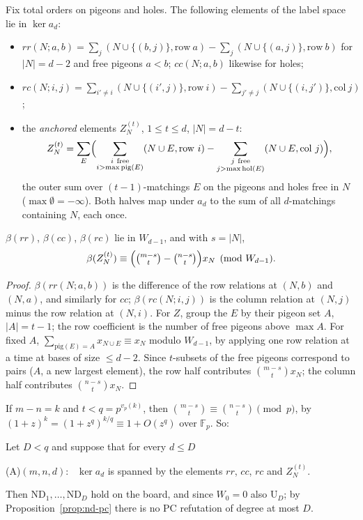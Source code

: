 Fix total orders on pigeons and holes.  The following elements of the label space lie in
$\ker a_d$:
\begin{itemize}
\item $rr(N;a,b)=\sum_j(N\cup\{(b,j)\},\mathrm{row}\ a)-\sum_j(N\cup\{(a,j)\},\mathrm{row}\ b)$
  for $|N|=d-2$ and free pigeons $a<b$; $cc(N;a,b)$ likewise for holes;
\item $rc(N;i,j)=\sum_{i'\ne i}(N\cup\{(i',j)\},\mathrm{row}\ i)-\sum_{j'\ne j}(N\cup\{(i,j')\},\mathrm{col}\ j)$;
\item the \emph{anchored} elements $Z^{(t)}_N$, $1\le t\le d$, $|N|=d-t$:
  \[
  Z^{(t)}_N=\sum_E\Bigl(\sum_{\substack{i\ \text{free}\\ i>\max\mathrm{pig}(E)}}(N\cup E,\mathrm{row}\ i)
     -\sum_{\substack{j\ \text{free}\\ j>\max\mathrm{hol}(E)}}(N\cup E,\mathrm{col}\ j)\Bigr),
  \]
  the outer sum over $(t-1)$-matchings $E$ on the pigeons and holes free in $N$
  ($\max\emptyset=-\infty$).  Both halves map under $a_d$ to the sum of all $d$-matchings
  containing $N$, each once.
\end{itemize}

\begin{lemma}\label{lem:lower-images}
$\beta(rr)$, $\beta(cc)$, $\beta(rc)$ lie in $W_{d-1}$, and with $s=|N|$,
\[
  \beta(Z^{(t)}_N)\equiv\Bigl(\tbinom{m-s}{t}-\tbinom{n-s}{t}\Bigr)x_N\pmod{W_{d-1}}.
\]
\end{lemma}

\begin{proof}
$\beta(rr(N;a,b))$ is the difference of the row relations at $(N,b)$ and $(N,a)$, and
similarly for $cc$; $\beta(rc(N;i,j))$ is the column relation at $(N,j)$ minus the row
relation at $(N,i)$.  For $Z$, group the $E$ by their pigeon set $A$, $|A|=t-1$; the row
coefficient is the number of free pigeons above $\max A$.  For fixed $A$,
$\sum_{\mathrm{pig}(E)=A}x_{N\cup E}\equiv x_N$ modulo $W_{d-1}$, by applying one row
relation at a time at bases of size $\le d-2$.  Since $t$-subsets of the free pigeons
correspond to pairs ($A$, a new largest element), the row half contributes
$\binom{m-s}{t}x_N$; the column half contributes $\binom{n-s}{t}x_N$.
\end{proof}

If $m-n=k$ and $t<q=p^{v_p(k)}$, then $\binom{m-s}t\equiv\binom{n-s}t\pmod p$, by
$(1+z)^k=(1+z^q)^{k/q}\equiv1+O(z^q)$ over $\mathbb F_p$.  So:

\begin{proposition}\label{prop:A-to-nd}
Let $D<q$ and suppose that for every $d\le D$
\begin{center}
(A)$(m,n,d)$: \ $\ker a_d$ is spanned by the elements $rr$, $cc$, $rc$ and $Z^{(t)}_N$.
\end{center}
Then $\mathrm{ND}_1,\dots,\mathrm{ND}_D$ hold on the board, and since $W_0=0$ also
$\mathrm{U}_D$; by Proposition~\ref{prop:nd-pc} there is no PC refutation of degree at most
$D$.
\end{proposition}

